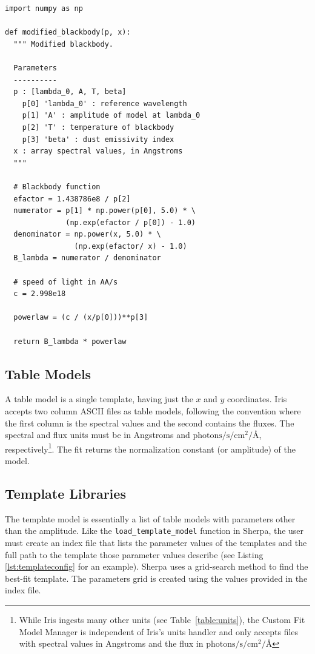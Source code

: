 \documentclass[preprint,authoryear,5p]{elsarticle}
\begin{document}
\begin{lstlisting}[style=python,
	caption={Example of a user-defined model that
can be dynamically loaded into Iris. The code, written as a Python function, 
implements a modified blackbody and can be combined 
in Iris with other built-in and custom components. Backslashes indicate line 
continuations.},
	label=lst:user_model_example]
import numpy as np

def modified_blackbody(p, x):
  """ Modified blackbody.

  Parameters
  ----------
  p : [lambda_0, A, T, beta]
    p[0] 'lambda_0' : reference wavelength
    p[1] 'A' : amplitude of model at lambda_0
    p[2] 'T' : temperature of blackbody
    p[3] 'beta' : dust emissivity index
  x : array spectral values, in Angstroms
  """

  # Blackbody function
  efactor = 1.438786e8 / p[2]
  numerator = p[1] * np.power(p[0], 5.0) * \
              (np.exp(efactor / p[0]) - 1.0)
  denominator = np.power(x, 5.0) * \
                (np.exp(efactor/ x) - 1.0)
  B_lambda = numerator / denominator

  # speed of light in AA/s
  c = 2.998e18

  powerlaw = (c / (x/p[0]))**p[3]

  return B_lambda * powerlaw
\end{lstlisting}

\subsection{Table Models} A table model is a single template, having just the
$x$ and $y$ coordinates. Iris accepts two column ASCII files as table models,
following the convention where the first column is the spectral values
and the second contains the fluxes. The spectral and flux units must be in Angstroms
and $\mathrm{photons}/\mathrm{s}/\mathrm{cm}^{2}/\mbox{\AA}$, respectively\footnote{
While Iris ingests many other units (see Table~\ref{table:units}), the Custom Fit Model
Manager is independent of Iris's units handler and only accepts files with spectral 
values in Angstroms and the flux in 
$\mathrm{photons}/\mathrm{s}/\mathrm{cm}^{2}/\mbox{\AA}$}.
The fit returns the normalization constant (or amplitude) of the model.

\begin{sloppypar}
\subsection{Template Libraries} The template model is essentially a list of
table models with parameters other than the amplitude. Like the
\texttt{load\_template\_model} function in Sherpa, the user must create an index
file that lists the parameter values of the templates and the full path to the
template those parameter values describe (see Listing \ref{lst:templateconfig}
for an example). Sherpa uses a grid-search method to find the best-fit template.
The parameters grid is created using the values provided in the index file.
\end{sloppypar}
\end{document}
